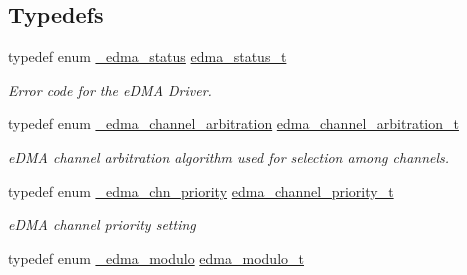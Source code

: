 \subsection*{Typedefs}
\begin{DoxyCompactItemize}
\item 
typedef enum \hyperlink{group__edma__hal_ga4522db4e23f95c72a0a7c93080a96355}{\+\_\+edma\+\_\+status} \hyperlink{group__edma__hal_gaba9351bb5972d15c73f14ba9bb507796}{edma\+\_\+status\+\_\+t}\hypertarget{group__edma__hal_gaba9351bb5972d15c73f14ba9bb507796}{}\label{group__edma__hal_gaba9351bb5972d15c73f14ba9bb507796}

\begin{DoxyCompactList}\small\item\em Error code for the e\+D\+MA Driver. \end{DoxyCompactList}\item 
typedef enum \hyperlink{group__edma__hal_gac176e6a80e3c1339ec8298bd51e9beab}{\+\_\+edma\+\_\+channel\+\_\+arbitration} \hyperlink{group__edma__hal_ga3d8315315a55394cbdf730af1f79d4bc}{edma\+\_\+channel\+\_\+arbitration\+\_\+t}\hypertarget{group__edma__hal_ga3d8315315a55394cbdf730af1f79d4bc}{}\label{group__edma__hal_ga3d8315315a55394cbdf730af1f79d4bc}

\begin{DoxyCompactList}\small\item\em e\+D\+MA channel arbitration algorithm used for selection among channels. \end{DoxyCompactList}\item 
typedef enum \hyperlink{group__edma__hal_ga483c1c022e62a1682cbb187ecdf3f5b0}{\+\_\+edma\+\_\+chn\+\_\+priority} \hyperlink{group__edma__hal_ga3b4d3d307e14bd39deaf89f1bc7ffa5e}{edma\+\_\+channel\+\_\+priority\+\_\+t}\hypertarget{group__edma__hal_ga3b4d3d307e14bd39deaf89f1bc7ffa5e}{}\label{group__edma__hal_ga3b4d3d307e14bd39deaf89f1bc7ffa5e}

\begin{DoxyCompactList}\small\item\em e\+D\+MA channel priority setting \end{DoxyCompactList}\item 
typedef enum \hyperlink{group__edma__hal_ga1a7d7ef429d6168ce7c9e43cee40d539}{\+\_\+edma\+\_\+modulo} \hyperlink{group__edma__hal_ga567f4aba444f1fb55ac796ea3c12b1f6}{edma\+\_\+modulo\+\_\+t}\hypertarget{group__edma__hal_ga567f4aba444f1fb55ac796ea3c12b1f6}{}\label{group__edma__hal_ga567f4aba444f1fb55ac796ea3c12b1f6}


\end{DoxyCompactItemize}
